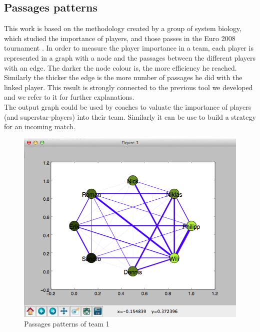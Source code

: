 \documentclass{acm_proc_article-sp-sigmod07}
\begin{document}
\subsection{Passages patterns}
This work is based on the methodology created by a group of system biology, which studied the importance of players, and those passes in the Euro 2008 tournament \cite{duch2010quantifying}. In order to measure the player importance in a team, each player is represented in a graph with a node and the passages between the different players with an edge. The darker the node colour is, the more efficiency he reached. Similarly the thicker the edge is the more number of passages he did with the linked player. This result is strongly connected to the previous tool we developed and we refer to it for further explanations. \\
The output graph could be used by coaches to valuate the importance of players (and superstar-players) into their team. Similarly it can be use to build a strategy for an incoming match.

\begin{figure}
\includegraphics[scale=0.38]{edge}
\caption{Passages patterns of team 1}
\end{figure}
\end{document}
